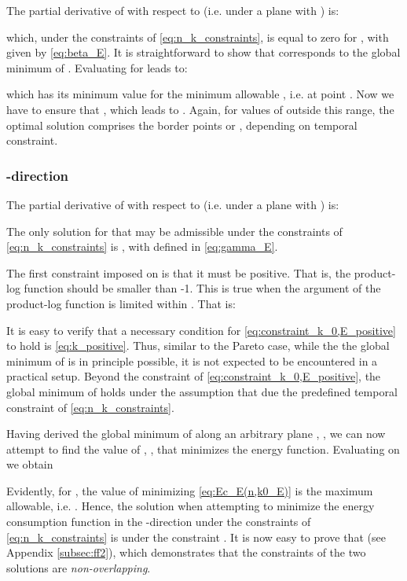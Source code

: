 \documentclass[twocolumn,english]{IEEEtran}
\theoremstyle{plain}
\theoremstyle{definition}
\begin{document}
The partial derivative of  with respect to  (i.e.
under a plane  with ) is:


which, under the constraints of \ref{eq:n_k_constraints}, is equal
to zero for , with
 given by \eqref{eq:beta_E}. It is straightforward
to show that  corresponds to the global minimum of
. Evaluating 
for  leads to: 

which has its minimum value for the minimum allowable ,
i.e. at point .
Now we have to ensure that ,
which leads to .
Again, for values of  outside this range, the optimal
solution comprises the border points 
or , depending on
temporal constraint.


\subsubsection{-direction}

The partial derivative of  with respect to  (i.e.
under a plane  with )
is: 

The only solution for 
that may be admissible under the constraints of \eqref{eq:n_k_constraints}
is , with 
defined in \eqref{eq:gamma_E}.

\noindent The first constraint imposed on  is that
it must be positive. That is, the product-log function should be smaller
than -1. This is true when the argument of the product-log function
is limited within  \cite{corless1996lambertw}.
That is:




It is easy to verify that a necessary condition for \eqref{eq:constraint_k_0,E_positive}
to hold is \eqref{eq:k_positive}. Thus, similar to the Pareto case,
while the the global minimum of  is in principle
possible, it is not expected to be encountered in a practical setup.
Beyond the constraint of \eqref{eq:constraint_k_0,E_positive}, the
global minimum of  holds under the assumption that
 due the predefined temporal constraint
of \eqref{eq:n_k_constraints}.

Having derived the global minimum of 
along an arbitrary plane , ,
we can now attempt to find the value of , ,
that minimizes the energy function. Evaluating 
on  we obtain




\noindent Evidently, for , the value of  minimizing
\eqref{eq:Ec_E(n,k0_E)} is the maximum allowable, i.e. .
Hence, the solution when attempting to minimize the energy consumption
function in the -direction under the constraints of \eqref{eq:n_k_constraints}
is 
under the constraint .
It is now easy to prove that 
(see Appendix \ref{subsec:ff2}), which demonstrates that the constraints
of the two solutions are \emph{non-overlapping}.
\end{document}
